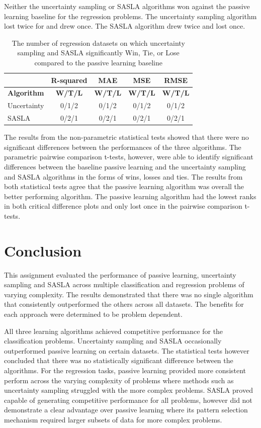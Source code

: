 \documentclass[conference]{IEEEtran}
\begin{document}
	Neither the uncertainty sampling or SASLA algorithms won against the passive learning baseline for the regression problems. The uncertainty sampling algorithm lost twice for and drew once. The SASLA algorithm drew twice and lost once. 
	
	\begin{table}[htbp]
		\centering
		\caption{The number of regression datasets on which uncertainty sampling and SASLA significantly Win, Tie, or Lose compared to the passive learning baseline}
		\label{tab:regression_wtl}
		\begin{tabular}{lcccc}
			\hline
			& \textbf{R-squared} & \textbf{MAE} & \textbf{MSE} & \textbf{RMSE} \\
			\hline
			\textbf{Algorithm} & \textbf{W/T/L} & \textbf{W/T/L} &\textbf{W/T/L} & \textbf{W/T/L} \\
			\hline
			Uncertainty & 0/1/2 & 0/1/2 & 0/1/2 & 0/1/2 \\
			SASLA       & 0/2/1 & 0/2/1 & 0/2/1 & 0/2/1 \\
			\hline
		\end{tabular}
	\end{table}
	
	The results from the non-parametric statistical tests showed that there were no significant differences between the performances of the three algorithms. The parametric pairwise comparison t-tests, however, were able to identify significant differences between the baseline passive learning and the uncertainty sampling and SASLA algorithms in the forms of wins, losses and ties. The results from both statistical tests agree that the passive learning algorithm was overall the better performing algorithm. The passive learning algorithm had the lowest ranks in both critical difference plots and only lost once in the pairwise comparison t-tests. 
	
	\section{Conclusion}\label{C}
	This assignment evaluated the performance of passive learning, uncertainty sampling and SASLA across multiple classification and regression problems of varying complexity. The results demonstrated that there was no single algorithm that consistently outperformed the others across all datasets. The benefits for each approach were determined to be problem dependent.
	
	All three learning algorithms achieved competitive performance for the classification problems. Uncertainty sampling and SASLA occasionally outperformed passive learning on certain datasets. The statistical tests however concluded that there was no statistically significant difference between the algorithms. For the regression tasks, passive learning provided more consistent perform across the varying complexity of problems where methods such as uncertainty sampling struggled with the more complex problems. SASLA proved capable of generating competitive performance for all problems, however did not demonstrate a clear advantage over passive learning where its pattern selection mechanism required larger subsets of data for more complex problems. 
	
\end{document}
